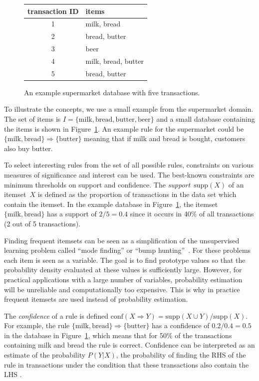 \documentclass[10pt,a4paper]{article}
\begin{document}
\begin{figure}
\centering
  \begin{tabular}{|c|l|}
  \hline
  {\bf transaction} ID & {\bf items}\\  
  
  \hline
  1 & milk, bread \\
  2 & bread, butter \\
  3 & beer \\
  4 & milk, bread, butter \\
  5 & bread, butter \\
  \hline
\end{tabular}
\caption{An example supermarket database with five transactions.\label{table:supermarket}}
\end{figure}

To illustrate the concepts, we use a small example from the supermarket
domain.  The set of items is $I= \{\mathrm{milk, bread, butter, beer}\}$
and a small database containing the items is shown in
Figure~\ref{table:supermarket}.  An example rule for the supermarket
could be $\{\mathrm{milk, bread}\} \Rightarrow \{\mathrm{butter}\}$
meaning that if milk and bread is bought, customers also buy butter.

To select interesting rules from the set of all possible rules,
constraints on various measures of significance and interest can be
used.  The best-known constraints are minimum thresholds on support and
confidence.  The \emph{support}~$\mathrm{supp}(X)$ of an itemset~$X$ is
defined as the proportion of transactions in the data set which contain
the itemset.  In the example database in Figure~\ref{table:supermarket},
the itemset $\{\mathrm{milk, bread}\}$ has a support of $2/5=0.4$ since
it occurs in 40\% of all transactions (2 out of 5 transactions).

Finding frequent
itemsets can be seen as a simplification of the unsupervised learning
problem called ``mode finding'' or ``bump
hunting''~\citep{arules:Hastie+Tibshirani+Friedman:2001}.  For these
problems each item is seen as a variable.  The goal is to find prototype
values so that the probability density evaluated at these values is
sufficiently large.  However, for practical applications with a large
number of variables, probability estimation will be unreliable and
computationally too expensive.  This is why in practice frequent
itemsets are used instead of probability estimation.

The \emph{confidence} of a rule is defined $\mathrm{conf}(X\Rightarrow
Y) = \mathrm{supp}(X \cup Y) / \mathrm{supp}(X)$.  For example, the rule
$\{\mathrm{milk, bread}\} \Rightarrow \{\mathrm{butter}\}$ has a
confidence of $0.2/0.4=0.5$ in the database in
Figure~\ref{table:supermarket}, which means that for 50\% of the
transactions containing milk and bread the rule is correct.
Confidence can be interpreted as an estimate of the probability
$P(Y|X)$, the probability of finding the RHS of the rule in transactions
under the condition that these transactions also contain the LHS
\citep[see e.g.,][]{arules:Hipp+Guentzer+Nakhaeizadeh:2000}.
\end{document}
